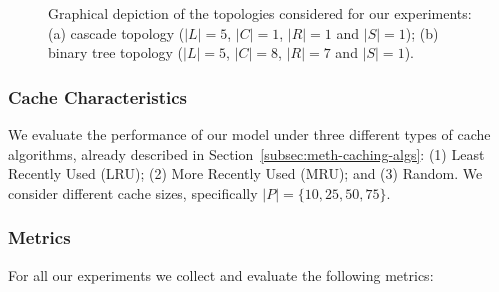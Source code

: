 \begin{figure}[h!]
    \centering


    \cprotect\caption{Graphical depiction of the topologies considered for 
        our experiments: (a) cascade topology ($|L| = 5$, $|C| = 1$, $|R| = 1$ 
        and $|S| = 1$); (b) binary tree topology 
        ($|L| = 5$, $|C| = 8$, $|R| = 7$ and $|S| = 1$).}
    \label{fig:exp-setup-nettop}

\end{figure}

\subsubsection{Cache Characteristics}
\label{subsec:exp-setup-cache}

We evaluate the performance of our model under three different types of cache 
algorithms, already described in Section~\ref{subsec:meth-caching-algs}: (1) 
Least Recently Used (LRU); (2) More Recently Used (MRU); and (3) Random. We 
consider different cache sizes, specifically $|P| = \{10, 25, 50, 75\}$.\shortvertbreak

\subsubsection{Metrics}
\label{subsec:exp-setup-metrics}

For all our experiments we collect and evaluate the following metrics:

